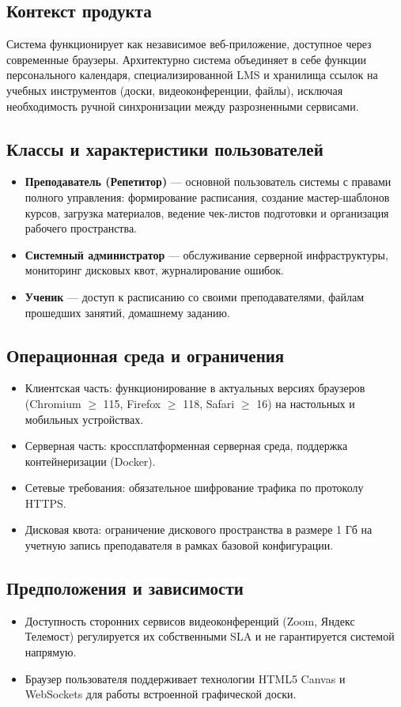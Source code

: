 \documentclass[12pt,a4paper]{article}
\begin{document}
\subsection{Контекст продукта}
Система функционирует как независимое веб-приложение, доступное через современные браузеры. Архитектурно система объединяет в себе функции персонального календаря, специализированной LMS и хранилища ссылок на учебных инструментов (доски, видеоконференции, файлы), исключая необходимость ручной синхронизации между разрозненными сервисами.

\subsection{Классы и характеристики пользователей}
\begin{itemize}
    \item \textbf{Преподаватель (Репетитор)} — основной пользователь системы с правами полного управления: формирование расписания, создание мастер-шаблонов курсов, загрузка материалов, ведение чек-листов подготовки и организация рабочего пространства.
    \item \textbf{Системный администратор} — обслуживание серверной инфраструктуры, мониторинг дисковых квот, журналирование ошибок.
    \item \textbf{Ученик} — доступ к расписанию со своими преподавателями, файлам прошедших занятий, домашнему заданию.
\end{itemize}

\subsection{Операционная среда и ограничения}
\begin{itemize}
    \item Клиентская часть: функционирование в актуальных версиях браузеров (Chromium $\ge$ 115, Firefox $\ge$ 118, Safari $\ge$ 16) на настольных и мобильных устройствах.
    \item Серверная часть: кроссплатформенная серверная среда, поддержка контейнеризации (Docker).
    \item Сетевые требования: обязательное шифрование трафика по протоколу HTTPS.
    \item Дисковая квота: ограничение дискового пространства в размере 1 Гб на учетную запись преподавателя в рамках базовой конфигурации.
\end{itemize}

\subsection{Предположения и зависимости}
\begin{itemize}
    \item Доступность сторонних сервисов видеоконференций (Zoom, Яндекс Телемост) регулируется их собственными SLA и не гарантируется системой напрямую.
    \item Браузер пользователя поддерживает технологии HTML5 Canvas и WebSockets для работы встроенной графической доски.
\end{itemize}
\end{document}
